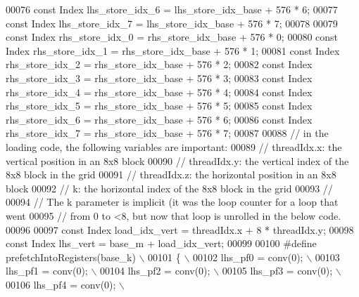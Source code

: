 \begin{DoxyCode}
00076   \textcolor{keyword}{const} Index lhs\_store\_idx\_6 = lhs\_store\_idx\_base + 576 * 6;
00077   \textcolor{keyword}{const} Index lhs\_store\_idx\_7 = lhs\_store\_idx\_base + 576 * 7;
00078 
00079   \textcolor{keyword}{const} Index rhs\_store\_idx\_0 = rhs\_store\_idx\_base + 576 * 0;
00080   \textcolor{keyword}{const} Index rhs\_store\_idx\_1 = rhs\_store\_idx\_base + 576 * 1;
00081   \textcolor{keyword}{const} Index rhs\_store\_idx\_2 = rhs\_store\_idx\_base + 576 * 2;
00082   \textcolor{keyword}{const} Index rhs\_store\_idx\_3 = rhs\_store\_idx\_base + 576 * 3;
00083   \textcolor{keyword}{const} Index rhs\_store\_idx\_4 = rhs\_store\_idx\_base + 576 * 4;
00084   \textcolor{keyword}{const} Index rhs\_store\_idx\_5 = rhs\_store\_idx\_base + 576 * 5;
00085   \textcolor{keyword}{const} Index rhs\_store\_idx\_6 = rhs\_store\_idx\_base + 576 * 6;
00086   \textcolor{keyword}{const} Index rhs\_store\_idx\_7 = rhs\_store\_idx\_base + 576 * 7;
00087 
00088   \textcolor{comment}{// in the loading code, the following variables are important:}
00089   \textcolor{comment}{// threadIdx.x: the vertical position in an 8x8 block}
00090   \textcolor{comment}{// threadIdx.y: the vertical index of the 8x8 block in the grid}
00091   \textcolor{comment}{// threadIdx.z: the horizontal position in an 8x8 block}
00092   \textcolor{comment}{// k: the horizontal index of the 8x8 block in the grid}
00093   \textcolor{comment}{//}
00094   \textcolor{comment}{// The k parameter is implicit (it was the loop counter for a loop that went}
00095   \textcolor{comment}{// from 0 to <8, but now that loop is unrolled in the below code.}
00096 
00097   \textcolor{keyword}{const} Index load\_idx\_vert = threadIdx.x + 8 * threadIdx.y;
00098   \textcolor{keyword}{const} Index lhs\_vert = base\_m + load\_idx\_vert;
00099 
00100 \textcolor{preprocessor}{#define prefetchIntoRegisters(base\_k)                           \(\backslash\)}
00101 \textcolor{preprocessor}{  \{                                                             \(\backslash\)}
00102 \textcolor{preprocessor}{    lhs\_pf0 = conv(0);                                          \(\backslash\)}
00103 \textcolor{preprocessor}{    lhs\_pf1 = conv(0);                                          \(\backslash\)}
00104 \textcolor{preprocessor}{    lhs\_pf2 = conv(0);                                          \(\backslash\)}
00105 \textcolor{preprocessor}{    lhs\_pf3 = conv(0);                                          \(\backslash\)}
00106 \textcolor{preprocessor}{    lhs\_pf4 = conv(0);                                          \(\backslash\)}

\end{DoxyCode}
